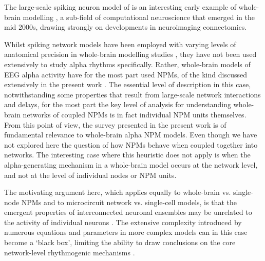 \documentclass[12pt,twoside]{article}
\begin{document}
The large-scale spiking neuron model of \citep{izhikevich2008large} is an interesting early example of whole-brain modelling \cite{griffiths2022whole}, a sub-field of computational neuroscience that emerged in the mid 2000s, drawing strongly on developments in neuroimaging connectomics.

Whilst spiking network models have been employed with varying levels of anatomical precision in whole-brain modelling studies \citep{deco2013resting, pronold2023multi}, they have not been used extensively to study alpha rhythms specifically. Rather, whole-brain models of EEG alpha activity have for the most part used NPMs, of the kind discussed extensively in the present work \citep{stefanovski2019linking, griffiths2020connectome, abeysuriya2018biophysical}. The essential level of description in this case, notwithstanding some properties that result from large-scale network interactions and delays, for the most part the key level of analysis for understanding whole-brain networks of coupled NPMs is in fact individual NPM units themselves. From this point of view, the survey presented in the present work is of fundamental relevance to whole-brain alpha NPM models. Even though we have not explored here the question of how NPMs behave when coupled together into networks. The interesting case where this heuristic does not apply is when the alpha-generating mechanism in a whole-brain model occurs at the network level, and not at the level of individual nodes or NPM units. 

The motivating argument here, which applies equally to whole-brain vs. single-node NPMs and to microcircuit network vs. single-cell models, is that the emergent properties of interconnected neuronal ensembles may be unrelated to the activity of individual neurons \citep{raj2020spectral}. The extensive complexity introduced by numerous equations and parameters in more complex models can in this case become a `black box', limiting the ability to draw conclusions on the core network-level rhythmogenic mechanisms \citep{taher2021next, turker2005black}.

\end{document}
